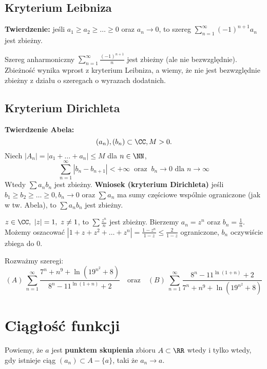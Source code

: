 \subsection{Kryterium Leibniza}
\textbf{Twierdzenie:} jeśli $a_1 \ge a_2 \ge \dots \ge 0$ oraz $a_n \to 0$, to szereg $\sum_{n=1}^{\infty}(-1)^{n+1}a_n$ jest zbieżny.

\begin{example}
    Szereg anharmoniczny $\sum_{n=1}^{\infty}\frac{(-1)^{n+1}}{n}$ jest zbieżny (ale nie bezwzględnie). Zbieżność wynika wprost z kryterium Leibniza, a wiemy, że nie jest bezwzględnie zbieżny z działu o szeregach o wyrazach dodatnich.
\end{example}
\subsection{Kryterium Dirichleta}
\textbf{Twierdzenie Abela:}
$$(a_n), (b_n) \subset \CC, M > 0.$$
Niech $|A_n| = |a_1 + \dots + a_n| \le M$ dla $n\in \NN$, 
$$
\sum_{n=1}^{\infty}|b_n-b_{n+1}| < +\infty \ \mbox{  oraz  } \ b_n \to 0 \mbox{ dla } n \to \infty
$$
Wtedy $\sum a_n b_n$ jest zbieżny.
\textbf{Wniosek (kryterium Dirichleta)} jeśli $b_1 \ge b_2 \ge \dots \ge 0, b_n \to 0$ oraz $\sum a_n$ ma sumy częściowe wspólnie ograniczone (jak w tw. Abela), to $\sum a_n b_n$ jest zbieżny.
\begin{example}
    $z\in \CC, \ |z| = 1, \ z \neq 1$, to $\sum\frac{z^n}{n}$ jest zbieżny.  Bierzemy $a_n=z^n$ oraz $b_n=\frac{1}{n}$. Możemy oszacować $|1 + z + z^2 + \dots + z^n| = \frac{1-z^n}{1-z} \le \frac{2}{1-z}$ ograniczone, $b_n$ oczywiście zbiega do $0$.
\end{example}

\begin{problems}
    \prob Rozważmy szeregi:
    $$
    (A)\ \sum_{n=1}^{\infty}\frac{7^n+n^9+\ln(19^{n^2}+8)}{8^n-11^{\ln(1+n)}+2}\quad\text{oraz}\quad (B)\ \sum_{n=1}^{\infty}\frac{8^n-11^{\ln(1+n)}+2}{7^n+n^9+\ln(19^{n^2}+8)}
    $$
\end{problems}

\section{Ciągłość funkcji}

Powiemy, że $a$ jest \textbf{punktem skupienia} zbioru $A \subset \RR$ wtedy i tylko wtedy, gdy istnieje ciąg $(a_n) \subset A - \{a\}$, taki że $a_n \to a$.


